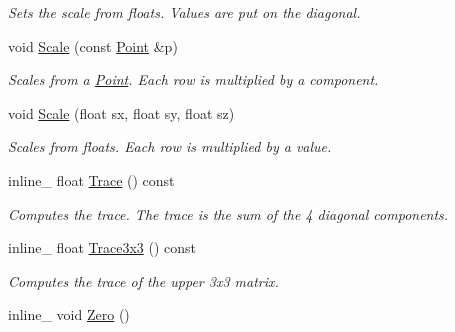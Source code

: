\begin{DoxyCompactItemize}
\begin{DoxyCompactList}\small\item\em Sets the scale from floats. Values are put on the diagonal. \end{DoxyCompactList}\item 
void \hyperlink{classOpcode_1_1Matrix4x4_ae2de2e594b9d0ee3619daa6cff641550}{Scale} (const \hyperlink{classOpcode_1_1Point}{Point} \&p)\hypertarget{classOpcode_1_1Matrix4x4_ae2de2e594b9d0ee3619daa6cff641550}{}\label{classOpcode_1_1Matrix4x4_ae2de2e594b9d0ee3619daa6cff641550}

\begin{DoxyCompactList}\small\item\em Scales from a \hyperlink{classOpcode_1_1Point}{Point}. Each row is multiplied by a component. \end{DoxyCompactList}\item 
void \hyperlink{classOpcode_1_1Matrix4x4_a533927d62cc7a3ad3506f66b6235951f}{Scale} (float sx, float sy, float sz)\hypertarget{classOpcode_1_1Matrix4x4_a533927d62cc7a3ad3506f66b6235951f}{}\label{classOpcode_1_1Matrix4x4_a533927d62cc7a3ad3506f66b6235951f}

\begin{DoxyCompactList}\small\item\em Scales from floats. Each row is multiplied by a value. \end{DoxyCompactList}\item 
inline\+\_\+ float \hyperlink{classOpcode_1_1Matrix4x4_abc833434327f6235bfa9333e1bfb987f}{Trace} () const \hypertarget{classOpcode_1_1Matrix4x4_abc833434327f6235bfa9333e1bfb987f}{}\label{classOpcode_1_1Matrix4x4_abc833434327f6235bfa9333e1bfb987f}

\begin{DoxyCompactList}\small\item\em Computes the trace. The trace is the sum of the 4 diagonal components. \end{DoxyCompactList}\item 
inline\+\_\+ float \hyperlink{classOpcode_1_1Matrix4x4_a0fe6c027f848ec749b6c5a5dd0038f6e}{Trace3x3} () const \hypertarget{classOpcode_1_1Matrix4x4_a0fe6c027f848ec749b6c5a5dd0038f6e}{}\label{classOpcode_1_1Matrix4x4_a0fe6c027f848ec749b6c5a5dd0038f6e}

\begin{DoxyCompactList}\small\item\em Computes the trace of the upper 3x3 matrix. \end{DoxyCompactList}\item 
inline\+\_\+ void \hyperlink{classOpcode_1_1Matrix4x4_ac6a6dbcb474ded67f5d016358fa583eb}{Zero} ()\hypertarget{classOpcode_1_1Matrix4x4_ac6a6dbcb474ded67f5d016358fa583eb}{}\label{classOpcode_1_1Matrix4x4_ac6a6dbcb474ded67f5d016358fa583eb}


\end{DoxyCompactItemize}
